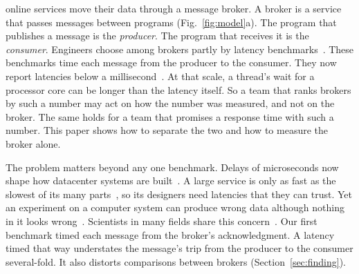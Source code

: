 \documentclass[10pt,journal,compsoc]{IEEEtran}
\begin{document}
\maketitle
\IEEEdisplaynontitleabstractindextext
\IEEEpeerreviewmaketitle



 online services move their data through a message broker. A broker is a
service that passes messages between programs (Fig.~\ref{fig:model}a). The program that publishes
a message is the \emph{producer}. The program that receives it is the \emph{consumer}. Engineers
choose among brokers partly by latency benchmarks~\cite{openmessaging2018}. These benchmarks time
each message from the producer to the consumer. They now report latencies below a
millisecond~\cite{redis_streams}. At that scale, a thread's wait for a processor core can be longer
than the latency itself. So a team that ranks brokers by such a number may act on how the number
was measured, and not on the broker. The same holds for a team that promises a response time with
such a number. This paper shows how to separate the two and how to measure the broker alone.

The problem matters beyond any one benchmark. Delays of microseconds now shape how datacenter
systems are built~\cite{barroso2017killer}. A large service is only as fast as the slowest of its
many parts~\cite{dean2013tail}, so its designers need latencies that they can trust. Yet an
experiment on a computer system can produce wrong data although nothing in it looks
wrong~\cite{mytkowicz2009wrong}. Scientists in many fields share this
concern~\cite{baker2016reproducibility}. Our first benchmark timed each message from the broker's
acknowledgment. A latency timed that way understates the message's trip from the producer to the
consumer several-fold. It also distorts comparisons between brokers (Section~\ref{sec:finding}).
\end{document}
